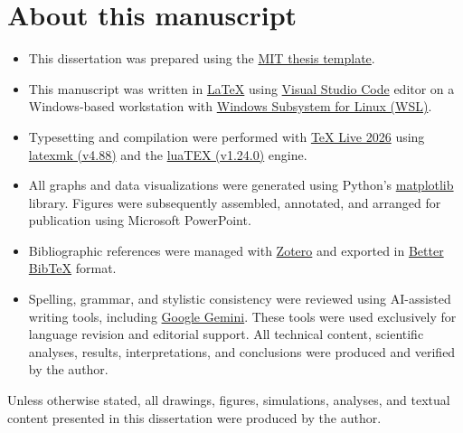 
\chapter*{About this manuscript} \label{sec:about}

\begin{itemize}
    \item This dissertation was prepared using the 
        \href{https://web.mit.edu/thesis/tex/}{MIT thesis template}.

    \item This manuscript was written in \href{https://en.wikipedia.org/wiki/LaTeX}{LaTeX} using 
        \href{https://code.visualstudio.com/}{Visual Studio Code} editor on a Windows-based 
        workstation with \href{https://en.wikipedia.org/wiki/Windows_Subsystem_for_Linux}{Windows 
        Subsystem for Linux (WSL)}.

    \item Typesetting and compilation were performed with \href{https://www.tug.org/texlive/}{TeX 
        Live 2026} using \href{https://mgeier.github.io/latexmk.html}{latexmk (v4.88)} and the
        \href{https://www.luatex.org/}{luaTEX (v1.24.0)} engine.

    \item All graphs and data visualizations were generated using Python's 
        \href{https://matplotlib.org/}{matplotlib} library. Figures were subsequently assembled, 
        annotated, and arranged for publication using Microsoft PowerPoint.

    \item Bibliographic references were managed with \href{https://www.zotero.org/}{Zotero} and 
        exported in \href{https://retorque.re/zotero-better-bibtex/}{Better BibTeX} format. 

    \item Spelling, grammar, and stylistic consistency were reviewed using AI-assisted 
        writing tools, including \href{https://gemini.google.com/}{Google Gemini}. These tools were 
        used exclusively for language revision and editorial support. All technical content, 
        scientific analyses, results, interpretations, and conclusions were produced and verified 
        by the author.

\end{itemize}


Unless otherwise stated, all drawings, figures, simulations, analyses, and textual content 
presented in this dissertation were produced by the author.
